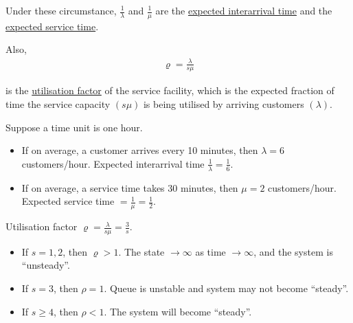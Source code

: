 Under these circumstance, $\frac{1}{\lambda}$ and $\frac{1}{\mu}$ are the \uline{expected interarrival time} and the \uline{expected service time}.

Also,
\begin{align*}
    \varrho = \frac{\lambda}{s\mu}
\end{align*}

is the \uline{utilisation factor} of the service facility, which is the expected fraction of time the service capacity $(s\mu)$ is being utilised by arriving customers $(\lambda)$.

\begin{example}
    Suppose a time unit is one hour.
    \begin{itemize}
        \item If on average, a customer arrives every 10 minutes, then $\lambda = 6$ customers/hour. Expected interarrival time $\frac{1}{\lambda} = \frac{1}{6}$.
    
        \item If on average, a service time takes 30 minutes, then $\mu = 2$ customers/hour. Expected service time $= \frac{1}{\mu} = \frac{1}{2}$.
    \end{itemize}
    Utilisation factor $\varrho = \frac{\lambda}{s\mu} = \frac{3}{s}$.
    \begin{itemize}
        \item If $s = 1,2$, then $\varrho>1$. The state $\to\infty$ as time $\to\infty$, and the system is ``unsteady''.
        \item If $s = 3$, then $\rho = 1$. Queue is unstable and system may not become ``steady''.
        \item If $s\geqslant 4$, then $\rho <1$. The system will become ``steady''. 
    \end{itemize}
\end{example}

